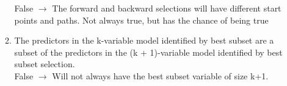 \documentclass[12pt]{article}
\begin{document}
\begin{enumerate}
\begin{enumerate}[label=(\roman*)]
                    False $\rightarrow$ The forward and backward selections will have different start points and paths. Not always true, but has the chance of being true
              \item The predictors in the k-variable model identified by best subset are a subset of the predictors in the (k + 1)-variable model identified by best subset selection.\\
                    False $\rightarrow$ Will not always have the best subset variable of size k+1.
          \end{enumerate}
\end{enumerate}

\end{document}
